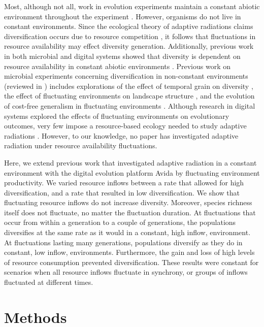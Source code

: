 \documentclass[10pt]{article}
\begin{document}
Most, although not all, work in evolution experiments maintain a constant abiotic environment throughout the experiment \cite{collins2011many}.
However, organisms do not live in constant environments.
Since the ecological theory of adaptive radiations claims diversification occurs due to resource competition \cite{schluter2000ecological}, it follows that fluctuations in resource availability may effect diversity generation.
Additionally, previous work in both microbial and digital systems showed that diversity is dependent on resource availability in constant abiotic environments \cite{kassen2000diversity,chow2004adaptive}.
Previous work on microbial experiments concerning diversification in non-constant environments (reviewed in \cite{kassen2002experimental,kassen2009toward} ) includes explorations of the effect of temporal grain on diversity \cite{venail2011diversification}, the effect of fluctuating environments on landscape structure \cite{cooper2010experimental}, and the evolution of cost-free generalism in fluctuating environments \cite{buckling2007experimental}.
Although research in digital systems explored the effects of fluctuating environments on evolutionary outcomes, very few impose a resource-based ecology needed to study adaptive radiations \cite{li2004digital,clune2007investigating,misevic2010experiments}.
However, to our knowledge, no paper has investigated adaptive radiation under resource availability fluctuations.

Here, we extend previous work that investigated adaptive radiation in a constant environment with the digital evolution platform Avida \cite{chow2004adaptive} by fluctuating environment productivity.
We varied resource inflows between a rate that allowed for high diversification, and a rate that resulted in low diversification.
We show that fluctuating resource inflows do not increase diversity.
Moreover, species richness itself does not fluctuate, no matter the fluctuation duration.
At fluctuations that occur from within a generation to a couple of generations, the populations diversifies at the same rate as it would in a constant, high inflow, environment.
At fluctuations lasting many generations, populations diversify as they do in constant, low inflow, environments.
Furthermore, the gain and loss of high levels of resource consumption prevented diversification.
These results were constant for scenarios when all resource inflows fluctuate in synchrony, or groups of inflows fluctuated at different times. 

\section{Methods}
\end{document}
